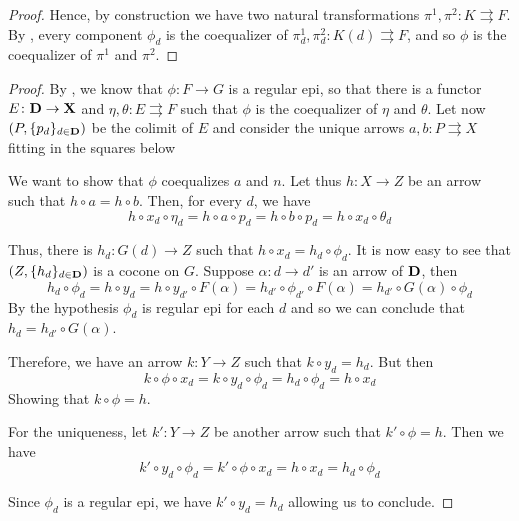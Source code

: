 \documentclass[3p]{elsarticle}
\def\D{\textbf {\textup{D}}}
\def\X{\textbf {\textup{X}}}
\theoremstyle{remark}
\theoremstyle{definition}
\begin{document}
{\begin{proof}
	
	Hence,  by construction we have two natural transformations $\pi^1, \pi^2\colon  K \rightrightarrows F$. By , every component $\phi_d$ is the coequalizer of $\pi_d^1, \pi_d^2\colon K(d) \rightrightarrows F$, and so $\phi$ is the coequalizer of $\pi^1$ and $\pi^2$.   
\end{proof}


\epicol*

\begin{proof}\label{epicol-proof}
	By , we know that $\phi\colon F \to G$ is a regular epi, so that there is a functor $E\colon \D\to \X$ and $\eta, \theta\colon E \rightrightarrows F$ such that $\phi$ is the coequalizer of $\eta$ and $\theta$. Let now $(P, \{p_d\}_{d \in \D})$ be the colimit of $E$ and consider the unique arrows $a, b\colon P \rightrightarrows X$ fitting in the squares below
\medskip

\noindent 
	\parbox{4cm}{} \hfill	\parbox{8cm}{
	We want to show that $\phi$ coequalizes $a$ and $n$. Let thus $h\colon X \to Z$ be an arrow such that $h \circ a = h \circ b$. Then, for every $d$, 
	we have
	\[h \circ x_d \circ \eta_d = h \circ a \circ p_d 
	= h \circ b \circ p_d 
	= h \circ x_d \circ \theta_d\]}
	
	\noindent
	Thus, there is $h_d: G(d) \to Z$ such that $h\circ x_d = h_d \circ \phi_d$. It is now easy to see that $(Z, \{h_d\}_{d \in \D})$ is a cocone on $G$. Suppose $\alpha: d \to d'$ is an arrow of $\D$, then
	\[h_d\circ \phi_d=h\circ y_d=h\circ y_{d'}\circ F(\alpha)=h_{d'}\circ \phi_{d'}\circ F(\alpha)=h_{d'}\circ G(\alpha)\circ \phi_d\]
		By the hypothesis $\phi_d$ is regular epi for each $d$ and so we can conclude that $h_d = h_{d'} \circ G(\alpha)$.
	
	Therefore, we have an arrow $k\colon Y \to Z$ such that $k \circ y_d = h_d$. But then
	\[
	k \circ \phi \circ x_d = k \circ y_d \circ \phi_d = h_d \circ \phi_d = h\circ x_d\]
	Showing that $k \circ \phi = h$.
	
	For the uniqueness, let $k': Y \to Z$ be another arrow such that $k' \circ \phi = h$. Then we have
	\[k'\circ y_d\circ \phi_d=k'\circ \phi \circ x_d=h\circ x_d=h_d\circ \phi_d\]
	
	Since $\phi_d$ is a regular epi, we have $k' \circ y_d = h_d$ allowing us to conclude.
\end{proof}
}
\end{document}
